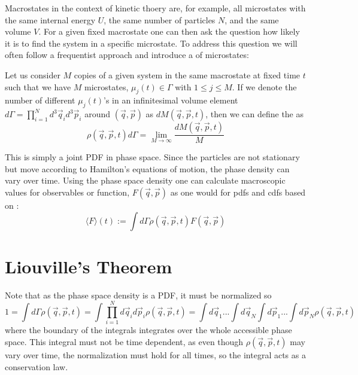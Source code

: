 \documentclass[12pt, a4paper, oneside, openright, titlepage]{book}
\begin{document}
Macrostates in the context of kinetic thoery are, for example, all microstates with the same internal energy $U$, the same number of particles $N$, and the same volume $V$. For a given fixed macrostate one can then ask the question how likely it is to find the system in a specific microstate. To address this question we will often follow a frequentist approach and introduce a  of microstates:

\begin{defn}
    Let us consider $M$ copies of a given system in the same macrostate at fixed time $t$ such that we have $M$ microstates, $\mu_j(t) \in \Gamma$ with $1 \leq j \leq M$. If we denote the number of different $\mu_j(t)$'s in an infinitesimal volume element $d\Gamma = \prod_{i=1}^Nd^3\vec{q}_id^3\vec{p}_i$ around $(\vec{q},\vec{p})$ as $dM(\vec{q},\vec{p},t)$, then we can define the  as \begin{equation*}
        \rho(\vec{q},\vec{p},t)d\Gamma = \lim\limits_{M\rightarrow \infty}\frac{dM(\vec{q},\vec{p},t)}{M}
    \end{equation*}
\end{defn}

This is simply a joint PDF in phase space. Since the particles are not stationary but move according to Hamilton's equations of motion, the phase density can vary over time. Using the phase space density one can calculate macroscopic values for observables or function, $F(\vec{q},\vec{p})$ as one would for pdfs and cdfs based on : \begin{equation}
    \langle F\rangle(t) := \int d\Gamma\rho(\vec{q},\vec{p},t)F(\vec{q},\vec{p})
\end{equation}




\section{Liouville's Theorem}

Note that as the phase space density is a PDF, it must be normalized so \begin{equation*}
    1 = \int d\Gamma\rho(\vec{q},\vec{p},t) = \int\prod_{i=1}^Nd\vec{q}_id\vec{p}_i\rho(\vec{q},\vec{p},t) = \int d\vec{q}_1...\int d\vec{q}_N\int d\vec{p}_1...\int d\vec{p}_N\rho(\vec{q},\vec{p},t)
\end{equation*}
where the boundary of the integrals integrates over the whole accessible phase space. This integral must not be time dependent, as even though $\rho(\vec{q},\vec{p},t)$ may vary over time, the normalization must hold for all times, so the integral acts as a conservation law. 
\end{document}
